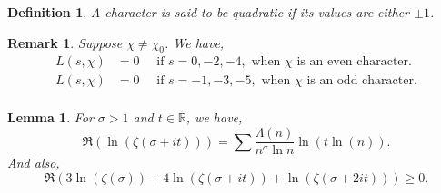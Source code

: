\documentclass{article}
\newtheorem{definition}{Definition}[section]
\newtheorem{lemma}{Lemma}[section]
\newtheorem{remark}{Remark}[section]
\newcommand{\R}[0]{\mathbb{R}}
\begin{document}
  \begin{definition}
    A character is said to be quadratic if its values are either $\pm1$. 
  \end{definition}

 \begin{remark}
  Suppose $\chi\not=\chi_0$. We have,
   \begin{align*}
    L(s,\chi) & = 0\quad\text{ if } s=0,-2,-4, \text{ when $\chi$ is an even character}.\\
    L(s,\chi) & = 0\quad\text{ if } s=-1,-3,-5, \text{ when $\chi$ is an odd character}.\\
  \end{align*}
 \end{remark}

  \begin{lemma}
    For $\sigma>1$ and $t\in \R$, we have,
    \begin{equation*}
      \Re(\ln(\zeta(\sigma+it))) = \sum{\frac {\Lambda(n)} {n^\sigma\ln n}}\ln(t\ln(n)).
    \end{equation*}
    And also,
    \begin{equation*}
      \Re(3\ln(\zeta(\sigma))+4\ln(\zeta(\sigma+it))+\ln(\zeta(\sigma+2it)))\geq0. 
    \end{equation*}
    \label{lemma_analytical_continuation_zeta}
  \end{lemma}
\end{document}
